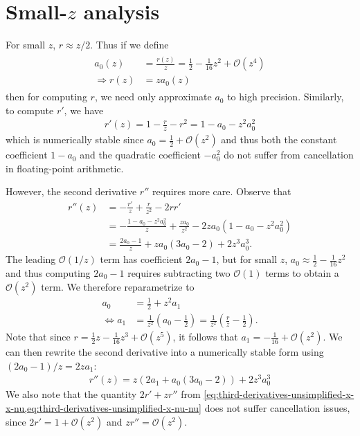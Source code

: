\documentclass{article}
\begin{document}
\section{Small-$z$ analysis}\label{sec:rician-small-z}

For small $z$, $r \approx z/2$.
Thus if we define
%
\begin{align}
  \boxed{
    \begin{aligned}
      a_0(z)           & = \frac{r(z)}{z} = \frac{1}{2} - \frac{1}{16}z^2 + \mathcal{O}(z^4) \\
      \Rightarrow r(z) & = z a_0(z)
    \end{aligned}
  }
\end{align}
%
then for computing $r$, we need only approximate $a_0$ to high precision.
Similarly, to compute $r'$, we have
%
\begin{align}\label{eq:r-prime-reparametrized}
  \boxed{r'(z) = 1 - \frac{r}{z} - r^2 = 1 - a_0 - z^2 a_0^2}
\end{align}
%
which is numerically stable since $a_0 = \frac{1}{2} + \mathcal{O}(z^2)$ and thus both the constant coefficient $1 - a_0$ and the quadratic coefficient $-a_0^2$ do not suffer from cancellation in floating-point arithmetic.

However, the second derivative $r''$ requires more care.
Observe that
%
\begin{align}
  r''(z) & = -\frac{r'}{z} + \frac{r}{z^2} - 2 r r'                                             \\
         & = -\frac{1 - a_0 - z^2 a_0^2}{z} + \frac{z a_0}{z^2} -  2 z a_0(1 - a_0 - z^2 a_0^2) \\
         & = \frac{2 a_0 - 1}{z} + z a_0 (3 a_0 - 2) + 2 z^3 a_0^3.
\end{align}
%
The leading $\mathcal{O}(1/z)$ term has coefficient $2a_0 - 1$, but for small $z$, $a_0 \approx \frac{1}{2} - \frac{1}{16}z^2$ and thus computing $2a_0 - 1$ requires subtracting two $\mathcal{O}(1)$ terms to obtain a $\mathcal{O}(z^2)$ term.
We therefore reparametrize to
%
\begin{align}
  a_0                 & = \frac{1}{2} + z^2 a_1 \label{eq:a0-reparametrized}                                                          \\
  \Leftrightarrow a_1 & = \frac{1}{z^2} (a_0 - \frac{1}{2}) = \frac{1}{z^2} (\frac{r}{z} - \frac{1}{2}). \label{eq:a1-reparametrized}
\end{align}
%
Note that since $r = \frac{1}{2}z - \frac{1}{16}z^3 + \mathcal{O}(z^5)$, it follows that $a_1 = -\frac{1}{16} + \mathcal{O}(z^2)$.
We can then rewrite the second derivative into a numerically stable form using $(2 a_0 - 1) / z = 2 z a_1$:
%
\begin{align}
  \boxed{r''(z) = z (2a_1 + a_0 (3 a_0 - 2)) + 2 z^3 a_0^3} \label{eq:r-second-derivative-reparametrized}
\end{align}
%
We also note that the quantity $2r' + z r''$ from \cref{eq:third-derivatives-unsimplified-x-x-nu,eq:third-derivatives-unsimplified-x-nu-nu} does not suffer cancellation issues, since $2r' = 1 + \mathcal{O}(z^2)$ and $z r'' = \mathcal{O}(z^2)$.
\end{document}
